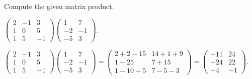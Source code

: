 \documentclass{article}
\begin{document}



\problemlabel

\noindent Compute the given matrix product.

\begin{exercise}  \label{c4.6.0d}
$\left(\begin{array}{rrr} 2 & -1 & 3\\ 1 & 0 & 5\\1 & 5 & -1\end{array}\right)
\left(\begin{array}{rrr} 1 & 7 \\ -2 & -1 \\ -5 & 3\end{array}\right)$.

\begin{solution}

$\left(\begin{array}{rrr} 2 &  -1 &3\\ 1 & 0 & 5 \\1 & 5 & -1
\end{array}\right)
\left(\begin{array}{rrr} 1 & 7 \\ -2 & -1 \\ -5 & 3\end{array}\right)
= \left(\begin{array}{cc} 2+2-15 & 14+1+9 \\ 1-25 & 7+15 \\
1-10+5 & 7-5-3 \end{array}\right)
= \left(\begin{array}{rr} -11 & 24 \\ -24 & 22 \\ -4 & -1
\end{array}\right)$.


\end{solution}
\end{exercise}





\problemlabel
\end{document}
